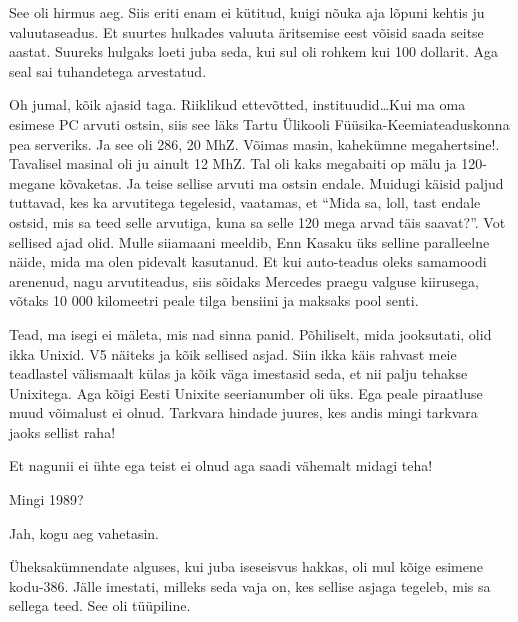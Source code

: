 See oli hirmus aeg. Siis eriti enam ei kütitud, kuigi nõuka aja lõpuni kehtis ju  valuutaseadus. Et suurtes hulkades valuuta äritsemise eest võisid saada  seitse aastat. Suureks hulgaks loeti juba seda, kui sul oli rohkem kui 100 dollarit. Aga seal sai tuhandetega arvestatud.


Oh jumal, kõik ajasid taga. Riiklikud ettevõtted, instituudid\ldots  Kui ma oma esimese PC arvuti ostsin, siis see läks Tartu Ülikooli Füüsika-Keemiateaduskonna pea serveriks. Ja see oli 286, 20 MhZ. Võimas masin, kahekümne megahertsine!. Tavalisel masinal oli ju ainult 12 MhZ. Tal oli kaks megabaiti op mälu ja 120-megane kõvaketas. Ja teise sellise arvuti ma ostsin endale. Muidugi käisid paljud tuttavad, kes ka arvutitega tegelesid, vaatamas, et \enquote{Mida sa, loll, tast endale ostsid, mis sa teed selle arvutiga, kuna sa selle 120 mega arvad täis saavat?}. Vot sellised ajad olid. Mulle siiamaani meeldib, Enn Kasaku  üks selline paralleelne näide, mida ma olen pidevalt kasutanud. Et kui auto-teadus oleks samamoodi arenenud, nagu arvutiteadus, siis sõidaks Mercedes praegu valguse kiirusega, võtaks  10 000 kilomeetri peale tilga bensiini ja maksaks pool senti.


Tead, ma isegi ei mäleta, mis nad sinna panid. Põhiliselt, mida jooksutati, olid ikka Unixid. V5 näiteks ja kõik sellised asjad. Siin ikka käis rahvast meie teadlastel välismaalt külas ja kõik väga imestasid seda, et nii palju tehakse Unixitega. Aga kõigi Eesti Unixite seerianumber oli üks. Ega peale piraatluse muud võimalust ei olnud. Tarkvara hindade juures, kes andis mingi tarkvara jaoks sellist raha!


Et nagunii ei ühte ega teist ei olnud aga saadi vähemalt midagi teha!


Mingi 1989? 
                 

Jah, kogu aeg vahetasin. 

Üheksakümnendate alguses, kui juba iseseisvus hakkas, oli mul kõige esimene kodu-386. Jälle imestati, milleks seda vaja on, kes sellise asjaga tegeleb, mis sa sellega teed. See oli tüüpiline.

